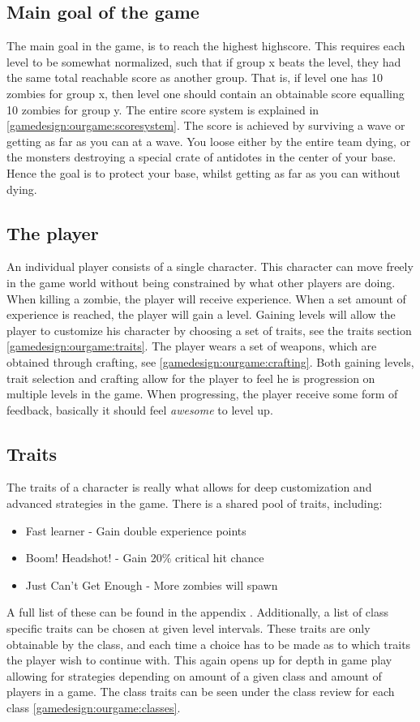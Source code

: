 \subsection*{Main goal of the game}
The main goal in the game, is to reach the highest highscore. This requires each level to be somewhat normalized, such that if group x beats the level, they had the same total reachable score as another group. That is, if level one has 10 zombies for group x, then level one should contain an obtainable score equalling 10 zombies for group y. The entire score system is explained in \ref{gamedesign:ourgame:scoresystem}. The score is achieved by surviving a wave or getting as far as you can at a wave. You loose either by the entire team dying, or the monsters destroying a special crate of antidotes in the center of your base. Hence the goal is to protect your base, whilst getting as far as you can without dying.

\subsection*{The player}
 An individual player consists of a single character. This character can move freely in the game world without being constrained by what other players are doing. When killing a zombie, the player will receive experience. When a set amount of experience is reached, the player will gain a level. Gaining levels will allow the player to customize his character by choosing a set of traits, see the traits section \ref{gamedesign:ourgame:traits}. The player wears a set of weapons, which are obtained through crafting, see \ref{gamedesign:ourgame:crafting}. Both gaining levels, trait selection and crafting allow for the player to feel he is progression on multiple levels in the game. When progressing, the player receive some form of feedback, basically it should feel \emph{awesome} to level up.

\subsection*{Traits}\label{gamedesign:ourgame:traits}
The traits of a character is really what allows for deep customization and advanced strategies in the game. There is a shared pool of traits, including:
\begin{itemize}
\item Fast learner - Gain double experience points
\item Boom! Headshot!  - Gain 20\% critical hit chance
\item Just Can’t Get Enough - More zombies will spawn
\end{itemize} 
A full list of these can be found in the appendix . Additionally, a list of class specific traits can be chosen at given level intervals. These traits are only obtainable by the class, and each time a choice has to be made as to which traits the player wish to continue with. This again opens up for depth in game play allowing for strategies depending on amount of a given class and amount of players in a game. The class traits can be seen under the class review for each class \ref{gamedesign:ourgame:classes}.

